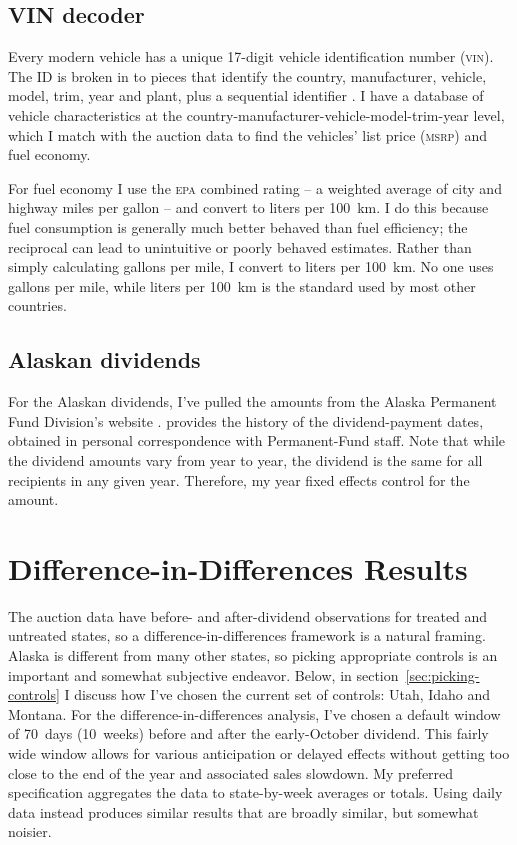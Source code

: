 \documentclass[11pt,letterpaper,oneside]{article}
\newcommand{\msrp}{\textsc{msrp}}
\newcommand{\vin}{\textsc{vin}}
\begin{document}
\begin{doublespacing}
\subsection{VIN decoder}

Every modern vehicle has a unique 17-digit vehicle identification number (\vin{}).
The ID is broken in to pieces that identify the country, manufacturer, vehicle, model, trim, year and plant, plus a sequential identifier \parencite{vin_details}.
I have a database of vehicle characteristics at the country\hyp{}manufacturer\hyp{}vehicle\hyp{}model\hyp{}trim\hyp{}year level, which I match with the auction data to find the vehicles' list price (\msrp{}) and fuel economy.

For fuel economy I use the \textsc{epa} combined rating -- a weighted average of city and highway miles per gallon -- and convert to liters per 100~km.
I do this because fuel consumption is generally much better behaved than fuel efficiency; the reciprocal can lead to unintuitive or poorly behaved estimates.
Rather than simply calculating gallons per mile, I convert to liters per 100~km.
No one uses gallons per mile, while liters per 100~km is the standard used by most other countries.

\subsection{Alaskan dividends}

For the Alaskan dividends, I've pulled the amounts from the Alaska Permanent Fund Division's website \parencite{apfd_payments_summary}.
\textcite{hsieh2003} provides the history of the dividend\hyp{}payment dates, obtained in personal correspondence with Permanent\hyp{}Fund staff.
Note that while the dividend amounts vary from year to year, the dividend is the same for all recipients in any given year.
Therefore, my year fixed effects control for the amount.


\section[DD Results]{Difference-in-Differences Results}

The auction data have before- and after\hyp{}dividend observations for treated and untreated states, so a difference\hyp{}in\hyp{}differences framework is a natural framing.
Alaska is different from many other states, so picking appropriate controls is an important and somewhat subjective endeavor.
Below, in section~\ref{sec:picking-controls} I discuss how I've chosen the current set of controls: Utah, Idaho and Montana.
For the difference\hyp{}in\hyp{}differences analysis, I've chosen a default window of 70~days (10~weeks) before and after the early\hyp{}October dividend.
This fairly wide window allows for various anticipation or delayed effects without getting too close to the end of the year and associated sales slowdown.
My preferred specification aggregates the data to state\hyp{}by\hyp{}week averages or totals. Using daily data instead produces similar results that are broadly similar, but somewhat noisier.




\end{doublespacing}
\end{document}
